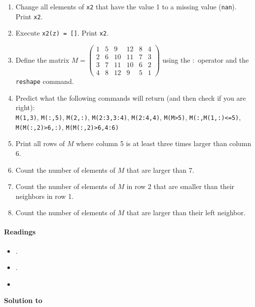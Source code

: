 \begin{enumerate}
\item
Change all elements of \texttt{x2} that have the value 1 to a missing value (\texttt{nan}).
Print \texttt{x2}.

\item
Execute \texttt{x2(z) = []}. Print \texttt{x2}.

\item
Define the matrix
\(M = \begin{pmatrix}
1 & 5 &  9 & 12 & 8 & 4\\
2 & 6 & 10 & 11 & 7 & 3\\
3 & 7 & 11 & 10 & 6 & 2\\
4 & 8 & 12 &  9 & 5 & 1
\end{pmatrix}\)
using the \({:}\) operator and the \texttt{reshape} command.

\item
Predict what the following commands will return (and then check if you are right):
\\
\texttt{M{(1,3)}}, \texttt{M{(:,5)}}, \texttt{M{(2,:)}}, \texttt{M{(2:3,3:4)}}, \texttt{M{(2:4,4)}},
\texttt{M{(M>5)}}, \texttt{M{(:,M{(1,:)}<=5)}}, \texttt{M{(M{(:,2)}>6,:)}}, \texttt{M{(M{(:,2)}>6,4:6)}}

\item
Print all rows of \(M\) where column 5 is at least three times larger than column 6.

\item
Count the number of elements of \(M\) that are larger than 7.

\item
Count the number of elements of \(M\) in row 2 that are smaller than their neighbors in row 1.

\item
Count the number of elements of \(M\) that are larger than their left neighbor.

\end{enumerate}


\paragraph{Readings}
\begin{itemize}
\item \textcite[Appendix A]{Brandimarte_2006_NumericalMethodsFinance}.
\item \textcite[Appendix B]{Miranda.Fackler_2002_AppliedComputationalEconomics}.
\item \textcite{Pfeifer_2017_MATLABHandout}
\end{itemize}

\begin{solution}\textbf{Solution to }
\ifDisplaySolutions%

\fi
\newpage
\end{solution}